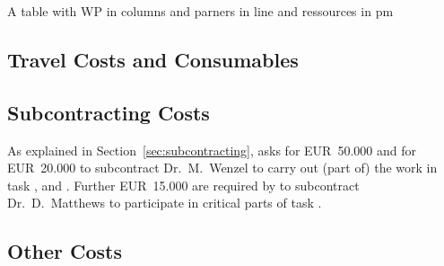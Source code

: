 {\color{red} A table with WP in columns and parners in line and
  ressources in pm}

\subsection{Travel Costs and Consumables}\label{sec:travel-costs}

\subsection{Subcontracting Costs}\label{sec:subcontracting-costs}

As explained in Section~\ref{sec:subcontracting},  asks for
EUR~50.000 and  for EUR~20.000 to subcontract Dr.\ M.\ Wenzel to
carry out (part of) the work in task
,  and
. Further EUR~15.000 are required
by  to subcontract Dr.\ D.\ Matthews to participate in
critical parts of task .




\subsection{Other Costs}


